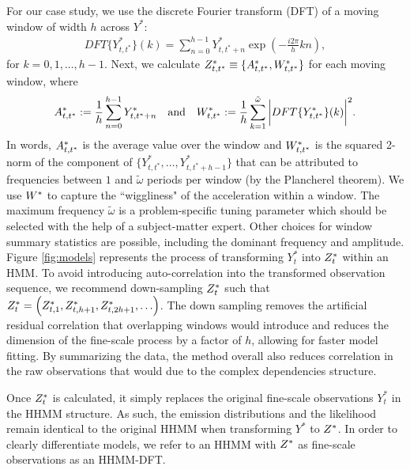 For our case study, we use the discrete Fourier transform (DFT) of a moving window of width $h$ across $Y^*$:
%
\begin{align*}
    DFT\{Y^*_{t,t^*}\}(k) = \sum_{n=0}^{h-1} Y^*_{t,t^*+n}\exp\left(-\frac{i 2\pi}{h} kn \right),
\end{align*}
%
for $k = 0, 1, \ldots, h-1$. Next, we calculate $Z^*_{t,t^*} \equiv \{A^*_{t,t^*},W^*_{t,t^*}\}$ for each moving window, where
%
\begin{equation}
    \label{eqn:z}
    \Zone_{t,t^*} := \frac{1}{h}\sum_{n=0}^{h-1}Y^*_{t,t^*+n} \quad \text{and} \quad \Ztwo_{t,t^*} := \frac{1}{h}\sum_{k=1}^{\tilde{\omega}}\bigg|DFT\{Y^*_{t,t^*}\}(k)\bigg|^2.
\end{equation}
%
In words, $A^*_{t,t^*}$ is the average value over the window and $W^*_{t,t^*}$ is the squared 2-norm of the component of $\{Y^*_{t,t^*}, \ldots, Y^*_{t,t^*+h-1}\}$ that can be attributed to frequencies between $1$ and $\tilde{\omega}$ periods per window (by the Plancherel theorem). We use $W^*$ to capture the ``wiggliness" of the acceleration within a window. The maximum frequency $\tilde{\omega}$ is a problem-specific tuning parameter which should be selected with the help of a subject-matter expert. Other choices for window summary statistics are possible, including the dominant frequency and amplitude. Figure \ref{fig:models} represents the process of transforming $Y^*_{t}$ into $Z^*_{t}$ within an HMM. To avoid introducing auto-correlation into the transformed observation sequence, we recommend down-sampling $Z^*_t$ such that $Z^*_t = \left(Z^*_{t,1},Z^*_{t,h+1},Z^*_{t,2h+1},\ldots\right)$. The down sampling removes the artificial residual correlation that overlapping windows would introduce and reduces the dimension of the fine-scale process by a factor of $h$, allowing for faster model fitting. By summarizing the data, the method overall also reduces correlation in the raw observations that would due to the complex dependencies structure.

Once $Z^*_t$ is calculated, it simply replaces the original fine-scale observations $Y^*_t$ in the HHMM structure. As such, the emission distributions and the likelihood remain identical to the original HHMM when transforming $Y^*$ to $Z^*$. In order to clearly differentiate models, we refer to an HHMM with $Z^*$ as fine-scale observations as an HHMM-DFT.


